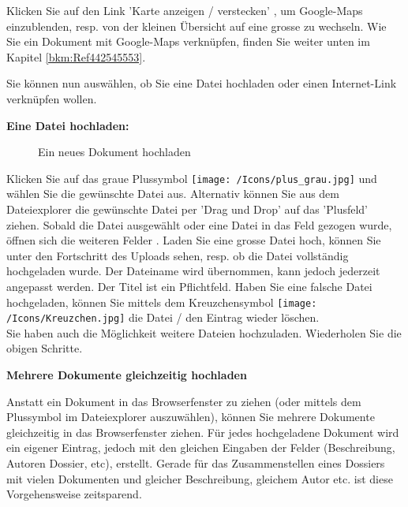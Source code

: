 Klicken Sie auf den Link 'Karte anzeigen / verstecken' , um Google-Maps einzublenden, resp. von der kleinen Übersicht auf eine grosse zu wechseln. Wie Sie ein Dokument mit Google-Maps verknüpfen, finden Sie weiter unten im Kapitel \ref{bkm:Ref442545553}. \newline

Sie können nun auswählen, ob Sie eine Datei hochladen  oder einen Internet-Link verknüpfen  wollen.

\vspace{\baselineskip}

\textbf{Eine Datei hochladen:} 
\begin{figure}[H]
\caption{Ein neues Dokument hochladen}
\end{figure}

Klicken Sie auf das graue Plussymbol \texttt{[image: /Icons/plus\_grau.jpg]}  und wählen Sie die gewünschte Datei aus. Alternativ können Sie aus dem Dateiexplorer die gewünschte Datei per 'Drag und Drop' auf das 'Plusfeld' ziehen. Sobald die Datei ausgewählt oder eine Datei in das Feld gezogen wurde, öffnen sich die weiteren Felder . Laden Sie eine grosse Datei hoch, können Sie unter  den Fortschritt des Uploads sehen, resp. ob die Datei vollständig hochgeladen wurde. Der Dateiname  wird übernommen, kann jedoch jederzeit angepasst werden. Der Titel ist ein Pflichtfeld. Haben Sie eine falsche Datei hochgeladen, können Sie mittels dem Kreuzchensymbol \texttt{[image: /Icons/Kreuzchen.jpg]}  die Datei / den Eintrag wieder löschen. \\
Sie haben auch die Möglichkeit weitere Dateien hochzuladen. Wiederholen Sie die obigen Schritte.

\vspace{\baselineskip}

\textbf{Mehrere Dokumente gleichzeitig hochladen}

Anstatt ein Dokument in das Browserfenster zu ziehen (oder mittels dem Plussymbol im Dateiexplorer auszuwählen), können Sie mehrere Dokumente gleichzeitig in das Browserfenster ziehen. Für jedes hochgeladene Dokument wird ein eigener Eintrag, jedoch mit den gleichen Eingaben der Felder (Beschreibung, Autoren Dossier, etc), erstellt. Gerade für das Zusammenstellen eines Dossiers mit vielen Dokumenten und gleicher Beschreibung, gleichem Autor etc. ist diese Vorgehensweise zeitsparend. 

